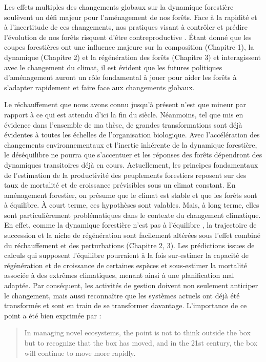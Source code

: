 Les effets multiples des changements globaux sur la dynamique forestière
soulèvent un défi majeur pour l'aménagement de nos forêts. Face à la
rapidité et à l'incertitude de ces changements, nos pratiques visant à
contrôler et prédire l'évolution de nos forêts risquent d'être
contreproductive \citep{puettmann_critique_2009}. Étant donné que les
coupes forestières ont une influence majeure sur la composition
(Chapitre 1), la dynamique (Chapitre 2) et la régénération des forêts
(Chapitre 3) et interagissent avec le changement du climat, il est
évident que les futures politiques d'aménagement auront un rôle
fondamental à jouer pour aider les forêts à s'adapter rapidement et
faire face aux changements globaux.

Le réchauffement que nous avons connu jusqu'à présent n'est que mineur
par rapport à ce qui est attendu d'ici la fin du siècle. Néanmoins, tel
que mis en évidence dans l'ensemble de ma thèse, de grandes
transformations sont déjà évidentes à toutes les échelles de
l'organisation biologique. Avec l'accélération des changements
environnementaux et l'inertie inhérente de la dynamique forestière, le
déséquilibre ne pourra que s'accentuer et les réponses des forêts
dépendront des dynamiques transitoires déjà en cours. Actuellement, les
principes fondamentaux de l'estimation de la productivité des
peuplements forestiers reposent sur des taux de mortalité et de
croissance prévisibles sous un climat constant. En aménagement
forestier, on présume que le climat est stable et que les forêts sont à
équilibre. À court terme, ces hypothèses sont valables. Mais, à long
terme, elles sont particulièrement problématiques dans le contexte du
changement climatique. En effet, comme la dynamique forestière n'est pas
à l'équilibre \citep{talluto_extinction_2017}, la trajectoire de
succession et la niche de régénération sont facilement altérées sous
l'effet combiné du réchauffement et des perturbations (Chapitre 2, 3).
Les prédictions issues de calculs qui supposent l'équilibre pourraient à
la fois sur-estimer la capacité de régénération et de croissance de
certaines espèces et sous-estimer la mortalité associée à des extrêmes
climatiques, menant ainsi à une planification mal adaptée. Par
conséquent, les activités de gestion doivent non seulement anticiper le
changement, mais aussi reconnaître que les systèmes actuels ont déjà été
transformés et sont en train de se transformer davantage. L'importance
de ce point a été bien exprimée par \citet{seastedt_management_2008} :

\begin{quote}
In managing novel ecosystems, the point is not to think outside the box
but to recognize that the box has moved, and in the 21st century, the
box will continue to move more rapidly.
\end{quote}

